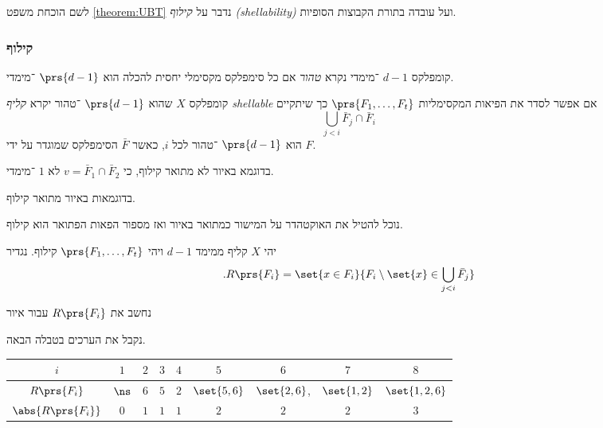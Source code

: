 \documentclass[a4paper,10pt,twoside,openany]{book}
\begin{document}

לשם הוכחת משפט
\ref{theorem:UBT}
נדבר על
\emph{קילוף \textenglish{(shellability)}}
ועל עובדה בתורת הקבוצות הסופיות.

\subsubsection{קילוף}

\begin{definition}
קומפלקס
$d-1$%
־מימדי נקרא
\emph{טהור}
אם כל סימפלקס מקסימלי יחסית להכלה הוא
$\prs{d-1}$%
־מימדי.
\end{definition}

\begin{definition}
קומפלקס
$X$
שהוא
$\prs{d-1}$%
־טהור
יקרא
\emph{קליף \textenglish{shellable}}
אם אפשר לסדר את הפיאות המקסימליות
$\prs{F_1, \ldots, F_t}$
כך שיתקיים
\[\bigcup_{j < i} \bar{F}_j \cap \bar{F}_i\]
הוא
$\prs{d-1}$%
־טהור לכל
$i$, כאשר
$\bar{F}$
הסימפלקס שמוגדר על ידי
$F$.
\end{definition}

\begin{example}
בדוגמא באיור
לא מתואר קילוף, כי
$v = \bar{F}_1 \cap \bar{F}_2$
לא
$1$%
־מימדי.

בדוגמאות באיור
מתואר קילוף.
\end{example}

\begin{example}
נוכל להטיל את האוקטהדר על המישור כמתואר באיור
ואז מספור הפאות הפתואר הוא קילוף.
\end{example}

\begin{definition}
יהי
$X$
קליף ממימד
$d-1$
ויהי
$\prs{F_1, \ldots, F_t}$
קילוף.
נגדיר
\[\text{.} R\prs{F_i} = \set{x \in F_i}{F_i \setminus \set{x} \in \bigcup_{j < i} \bar{F}_j}\]
\end{definition}

\begin{example}
נחשב את
$R\prs{F_i}$
עבור איור

נקבל את הערכים בטבלה הבאה.

\begin{center}
\begin{english}
\begin{tabular}{| c | c | c | c | c | c | c | c | c |}
\hline
$i$ & $1$ & $2$ & $3$ & $4$ & $5$ & $6$ & $7$ & $8$ \\
\hline
$R\prs{F_i}$ & $\ns$ & $6$ & $5$ & $2$ & $\set{5,6}$ & $\set{2,6}$, & $\set{1,2}$ & $\set{1,2,6}$ \\
\hline
$\abs{R\prs{F_i}}$ & $0$ & $1$ & $1$ & $1$ & $2$ & $2$ & $2$ & $3$ \\
\hline
\end{tabular}
\end{english}
\end{center}
\end{example}
\end{document}
